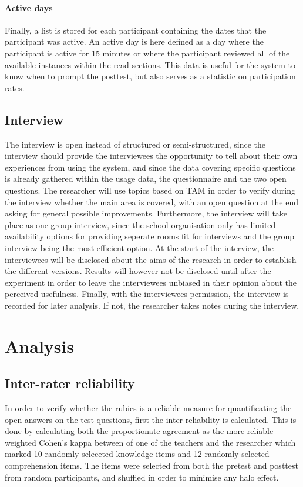 \paragraph{Active days} Finally, a list is stored for each participant containing the dates that the participant was active. An active day is here defined as a day where the participant is active for 15 minutes or where the participant reviewed all of the available instances within the read sections. This data is useful for the system to know when to prompt the posttest, but also serves as a statistic on participation rates.

\subsection{Interview}

The interview is open instead of structured or semi-structured, since the interview should provide the interviewees the opportunity to tell about their own experiences from using the system, and since the data covering specific questions is already gathered within the usage data, the questionnaire and the two open questions. The researcher will use topics based on TAM in order to verify during the interview whether the main area is covered, with an open question at the end asking for general possible improvements. Furthermore, the interview will take place as one group interview, since the school organisation only has limited availability options for providing seperate rooms fit for interviews and the group interview being the most efficient option. At the start of the interview, the interviewees will be disclosed about the aims of the research in order to establish the different versions. Results will however not be disclosed until after the experiment in order to leave the interviewees unbiased in their opinion about the perceived usefulness. Finally, with the interviewees permission, the interview is recorded for later analysis. If not, the researcher takes notes during the interview.

\section{Analysis}
\label{sec:analysis}

\subsection{Inter-rater reliability}

In order to verify whether the rubics is a reliable measure for quantificating the open answers on the test questions, first the inter-reliability is calculated. This is done by calculating both the proportionate agreement as the more reliable weighted Cohen's kappa \cite{kappa} between of one of the teachers and the researcher which marked 10 randomly seleceted knowledge items and 12 randomly selected comprehension items. The items were selected from both the pretest and posttest from random participants, and shuffled in order to minimise any halo effect.

